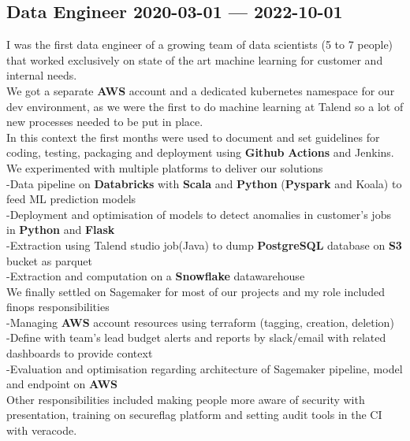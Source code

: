 \documentclass[10pt]{article}
\begin{document}
\subsection{{Data Engineer \hspace*{\fill} 2020-03-01 --- 2022-10-01}}
\smallskip
{}
\medskip
I was the first data engineer of a growing team of data scientists (5 to 7 people) that worked exclusively on state of the art machine learning for customer and internal needs.\\
            We got a separate \textbf{AWS} account and a dedicated kubernetes namespace for our dev environment, as we were the first to do machine learning at Talend so a lot of new processes needed to be put in place.\\
            In this context the first months were used to document and set guidelines for coding, testing, packaging and deployment using \textbf{Github} \textbf{Actions} and Jenkins.\\
            We experimented with multiple platforms to deliver our solutions\\
            -Data pipeline on \textbf{Databricks} with \textbf{Scala} and \textbf{Python} (\textbf{Pyspark} and Koala) to feed ML prediction models\\
            -Deployment and optimisation of models to detect anomalies in customer’s jobs in \textbf{Python} and \textbf{Flask}\\
            -Extraction using Talend studio job(Java) to dump \textbf{PostgreSQL} database on \textbf{S3} bucket as parquet\\
            -Extraction and computation on a \textbf{Snowflake} datawarehouse\\
            We finally settled on Sagemaker for most of our projects and my role included finops responsibilities\\
            -Managing \textbf{AWS} account resources using terraform (tagging, creation, deletion)\\
            -Define with team's lead budget alerts and reports by slack/email with related dashboards to provide context\\
            -Evaluation and optimisation regarding architecture of Sagemaker pipeline, model and endpoint on \textbf{AWS}\\
            Other responsibilities included making people more aware of security with presentation, training on secureflag platform and setting audit tools in the CI with veracode.
\medskip
\end{document}

